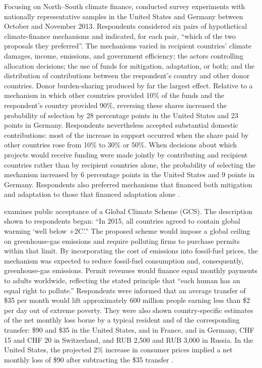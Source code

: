 \documentclass[11pt,a4paper]{article}
\begin{document}
Focusing on North--South climate finance, \citet{gampfer_obtaining_2014} conducted survey experiments with nationally representative samples in the United States and Germany between October and November 2013. Respondents considered six pairs of hypothetical climate-finance mechanisms and indicated, for each pair, ``which of the two proposals they preferred''. The mechanisms varied in recipient countries' climate damages, income, emissions, and government efficiency; the actors controlling allocation decisions; the use of funds for mitigation, adaptation, or both; and the distribution of contributions between the respondent's country and other donor countries. Donor burden-sharing produced by far the largest effect. Relative to a mechanism in which other countries provided 10\% of the funds and the respondent's country provided 90\%, reversing these shares increased the probability of selection by 28 percentage points in the United States and 23 points in Germany. Respondents nevertheless accepted substantial domestic contributions: most of the increase in support occurred when the share paid by other countries rose from 10\% to 30\% or 50\%. 
When decisions about which projects would receive funding were made jointly by contributing and recipient countries rather than by recipient countries alone, the probability of selecting the mechanism increased by 6 percentage points in the United States and 9 points in Germany. Respondents also preferred mechanisms that financed both mitigation and adaptation to those that financed adaptation alone \citep[Table 1 \& Figure 2]{gampfer_obtaining_2014}.


\citet{fabre_public_2026} examines public acceptance of a Global Climate Scheme (GCS). The description shown to respondents began: ``In 2015, all countries agreed to contain global warming `well below +2\textdegree{}C'.'' The proposed scheme would impose a global ceiling on greenhouse-gas emissions and require polluting firms to purchase permits within that limit. By incorporating the cost of emissions into fossil-fuel prices, the mechanism was expected to reduce fossil-fuel consumption and, consequently, greenhouse-gas emissions. Permit revenues would finance equal monthly payments to adults worldwide, reflecting the stated principle that ``each human has an equal right to pollute.'' Respondents were informed that an average transfer of \$35 per month would lift approximately 600 million people earning less than \$2 per day out of extreme poverty. They were also shown country-specific estimates of the net monthly loss borne by a typical resident and of the corresponding transfer: \$90 and \$35 in the United States,  and  in France,  and  in Germany, CHF 15 and CHF 20 in Switzerland, and RUB 2,500 and RUB 3,000 in Russia. In the United States, the projected 2\% increase in consumer prices implied a net monthly loss of \$90 after subtracting the \$35 transfer \citep[Table S2]{fabre_public_2026}.
\end{document}

